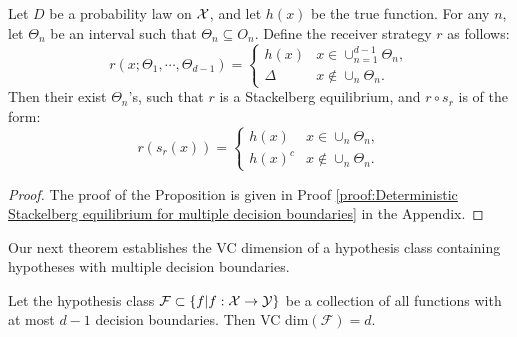 \begin{prop}\label{prop:Deterministic Stackelberg equilibrium for multiple decision boundaries}
	Let $D$ be a probability law on $\mathcal{X}$, and let $h(x)$ be the true function. For any $n$, let $\Theta_n$ be an interval such that $\Theta_n \subseteq O_n$. Define the receiver strategy $r$ as follows:
	\begin{equation}\label{eqn:stack multiple}
		r(x;\Theta_1,\cdots,\Theta_{d-1}) = \begin{cases}
			h(x) & x \in \cup_{n=1}^{d-1} \Theta_n, \\
			\Delta & x \not\in \cup_n \Theta_n.
		\end{cases}
	\end{equation}
	Then their exist $\Theta_n$'s, such that $r$ is a Stackelberg equilibrium, and $r \circ s_r$ is of the form:
	\begin{equation*}
		r(s_r(x)) = \begin{cases}
			h(x) & x \in \cup_n \Theta_n, \\
			h(x)^c & x \not\in \cup_n \Theta_n.
		\end{cases}
	\end{equation*}
\end{prop}


\begin{proof} The proof of the Proposition is given in Proof \ref{proof:Deterministic Stackelberg equilibrium for multiple decision boundaries} in the Appendix.


\end{proof}

Our next theorem establishes the VC dimension of a hypothesis class containing hypotheses with multiple decision boundaries.

\begin{prop}\label{prop: VC dimension}
    Let the hypothesis class $\mathcal{F} \subset \{f| f:\mathcal{X} \rightarrow \mathcal{Y}\}$ be a collection of all functions with at most $d-1$ decision boundaries. Then VC dim$(\mathcal{F}) = d$.
\end{prop}

